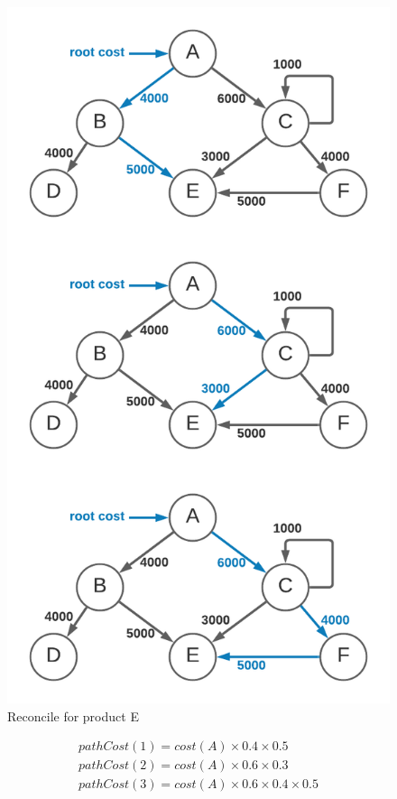 \documentclass[10pt, a4paper, twocolumn]{article}
\begin{document}
    \begin{figure}[H]
      \centering
      \includegraphics[width=\linewidth]{./truth-and-reconciliation-reconcile-e.png}
      \caption{Reconcile for product E}
      \label{figure:5}
    \end{figure}

    \begin{gather*}
        pathCost(1) = cost(A) \times 0.4 \times 0.5 \\
        pathCost(2) = cost(A) \times 0.6 \times 0.3 \\
        pathCost(3) = cost(A) \times 0.6 \times 0.4 \times 0.5 \\
    \end{gather*}
\end{document}
